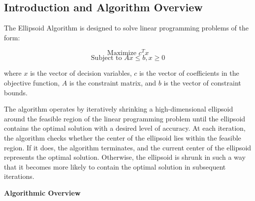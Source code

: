 \documentclass[12pt]{book} %
\begin{document}
\subsection{Introduction and Algorithm Overview}

The Ellipsoid Algorithm is designed to solve linear programming problems of the form:

\[
\text{Maximize } c^T x
\]
\[
\text{Subject to } Ax \leq b, x \geq 0
\]

where \(x\) is the vector of decision variables, \(c\) is the vector of coefficients in the objective function, \(A\) is the constraint matrix, and \(b\) is the vector of constraint bounds.

The algorithm operates by iteratively shrinking a high-dimensional ellipsoid around the feasible region of the linear programming problem until the ellipsoid contains the optimal solution with a desired level of accuracy. At each iteration, the algorithm checks whether the center of the ellipsoid lies within the feasible region. If it does, the algorithm terminates, and the current center of the ellipsoid represents the optimal solution. Otherwise, the ellipsoid is shrunk in such a way that it becomes more likely to contain the optimal solution in subsequent iterations.

\textbf{Algorithmic Overview}
\end{document}
